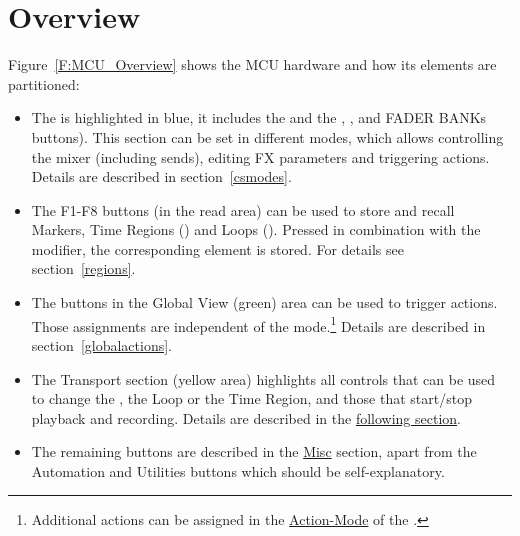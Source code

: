 \section{Overview}\label{overview}

Figure~\ref{F:MCU_Overview} shows the MCU hardware and how its elements are
partitioned:
\begin{itemize}

\item The \css is highlighted in blue, it includes the \mfader and the
  \flip, \gv, \nv and FADER BANKs buttons). This section can be set in
  different modes, which allows controlling the \reaper mixer
  (including sends), editing FX parameters and triggering \reaper
  actions. Details are described in section~\ref{csmodes}.
 
\item The F1-F8 buttons (in the read area) can be used to store and
  recall Markers, Time Regions (\option) and Loops (\alt). Pressed in
  combination with the \control modifier, the corresponding element is
  stored. For details see section~\ref{regions}.

\item The buttons in the Global View (green) area can be used to
  trigger \reaper actions. Those assignments are independent of the
  \cs mode.\footnote{Additional actions can be assigned in the
    \hyperref[actionmode]{Action-Mode} of the \css.} Details are
  described in section~\ref{globalactions}.


\item The Transport section (yellow area) highlights all controls that
  can be used to change the \ec, the Loop or the Time Region, and
  those that start/stop playback and recording. Details are described
  in the \hyperref[transport]{following section}.

\item The remaining buttons are described in the \hyperref[misc]{Misc}
  section, apart from the Automation and Utilities buttons which should be
  self-explanatory.



\end{itemize}

